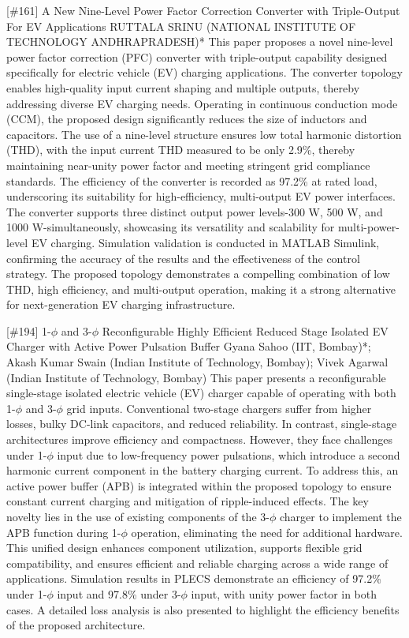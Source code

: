 {} \begin{abstract_online} {[\#161] A New Nine-Level Power Factor Correction Converter with Triple-Output For EV Applications } {} {RUTTALA SRINU (NATIONAL INSTITUTE OF TECHNOLOGY ANDHRAPRADESH)*} {} This paper proposes a novel nine-level power factor correction (PFC) converter with triple-output capability designed specifically for electric vehicle (EV) charging applications. The converter topology enables high-quality input current shaping and multiple outputs, thereby addressing diverse EV charging needs. Operating in continuous conduction mode (CCM), the proposed design significantly reduces the size of inductors and capacitors. The use of a nine-level structure ensures low total harmonic distortion (THD), with the input current THD measured to be only 2.9\%, thereby maintaining near-unity power factor and meeting stringent grid compliance standards. The efficiency of the converter is recorded as 97.2\% at rated load, underscoring its suitability for high-efficiency, multi-output EV power interfaces. The converter supports three distinct output power levels-300 W, 500 W, and 1000 W-simultaneously, showcasing its versatility and scalability for multi-power-level EV charging. Simulation validation is conducted in MATLAB Simulink, confirming the accuracy of the results and the effectiveness of the control strategy. The proposed topology demonstrates a compelling combination of low THD, high efficiency, and multi-output operation, making it a strong alternative for next-generation EV charging infrastructure.  \end{abstract_online} 
{} \begin{abstract_online} {[\#194] 1-$\phi$ and 3-$\phi$ Reconfigurable Highly Efficient Reduced Stage Isolated EV Charger with Active Power Pulsation Buffer} {} {Gyana Sahoo (IIT, Bombay)*; Akash Kumar  Swain (Indian Institute of Technology, Bombay); Vivek Agarwal (Indian Institute of Technology, Bombay)} {} This paper presents a reconfigurable single-stage isolated electric vehicle (EV) charger capable of operating with both 1-$\phi$ and 3-$\phi$ grid inputs. Conventional two-stage chargers suffer from higher losses, bulky DC-link capacitors, and reduced reliability. In contrast, single-stage architectures improve efficiency and compactness. However, they face challenges under 1-$\phi$ input due to low-frequency power pulsations, which introduce a second harmonic current component in the battery charging current. To address this, an active power buffer (APB) is integrated within the proposed topology to ensure constant current charging and mitigation of ripple-induced effects. The key novelty lies in the use of existing components of the 3-$\phi$ charger to implement the APB function during 1-$\phi$ operation, eliminating the need for additional hardware. This unified design enhances component utilization, supports flexible grid compatibility, and ensures efficient and reliable charging across a wide range of applications. Simulation results in PLECS demonstrate an efficiency of 97.2\% under 1-$\phi$ input and 97.8\% under 3-$\phi$ input, with unity power factor in both cases. A detailed loss analysis is also presented to highlight the efficiency benefits of the proposed architecture. \end{abstract_online} 
